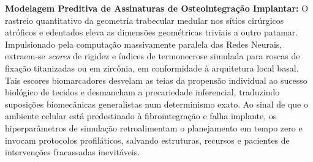 \textbf{Modelagem Preditiva de Assinaturas de Osteointegração Implantar:} O rastreio quantitativo da geometria trabecular medular nos sítios cirúrgicos atróficos e edentados eleva as dimensões geométricas triviais a outro patamar. Impulsionado pela computação massivamente paralela das Redes Neurais, extraem-se \textit{scores} de rigidez e índices de termonecrose simulada para roscas de fixação titanizadas ou em zircônia, em conformidade à arquitetura local basal. Tais escores biomarcadores desvelam as teias da propensão individual ao sucesso biológico de tecidos e desmancham a precariedade inferencial, traduzindo suposições biomecânicas generalistas num determinismo exato. Ao sinal de que o ambiente celular está predestinado à fibrointegração e falha implante, os hiperparâmetros de simulação retroalimentam o planejamento em tempo zero e invocam protocolos profiláticos, salvando estruturas, recursos e pacientes de intervenções fracassadas inevitáveis.
